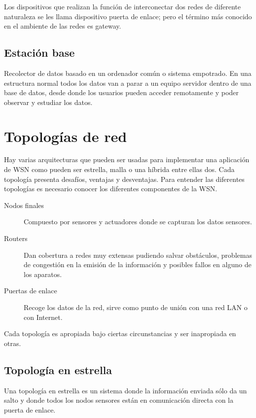 Los dispositivos que realizan la funci\'on de interconectar dos redes de diferente naturaleza se les llama dispositivo
puerta de enlace; pero el t\'ermino m\'as conocido en el ambiente de las redes es gateway. 

\subsection{Estaci\'on base}
Recolector de datos basado en un ordenador com\'un o sistema empotrado. En una estructura normal todos los datos van a
parar a un equipo servidor dentro de una base de datos, desde donde los usuarios pueden acceder remotamente y poder
observar y estudiar los datos.

\section{Topolog\'ias de red} 

Hay varias arquitecturas que pueden ser usadas para implementar una aplicaci\'on de WSN como pueden ser estrella, malla o
una h\'ibrida entre ellas dos. Cada topolog\'ia presenta desaf\'ios, ventajas y desventajas. Para entender las diferentes
topolog\'ias es necesario conocer los diferentes componentes de la WSN. 

\begin{description}
\item [Nodos finales] Compuesto por sensores y actuadores donde se capturan los datos sensores. 

\item [Routers] Dan cobertura a redes muy extensas pudiendo salvar obst\'aculos, problemas de congesti\'on en la emisi\'on de
la informaci\'on y posibles fallos en alguno de los aparatos. 

\item [Puertas de enlace] Recoge los datos de la red, sirve como punto de uni\'on con una red LAN o con Internet. 
\end{description}

Cada topolog\'ia es apropiada bajo ciertas circunstancias y ser inapropiada en otras. 

\subsection{Topolog\'ia en estrella}
Una topolog\'ia en estrella es un sistema donde la informaci\'on enviada s\'olo da un salto y donde todos los nodos sensores
est\'an en comunicaci\'on directa con la puerta de enlace.

